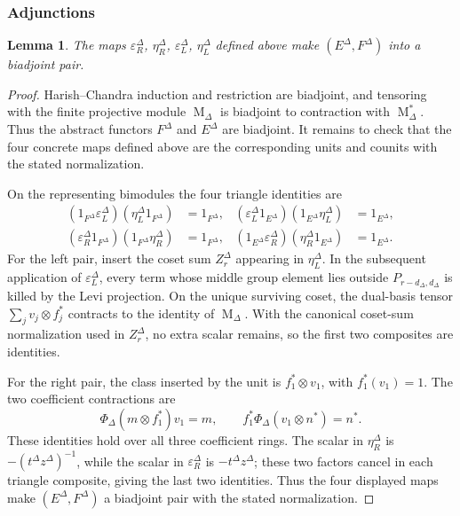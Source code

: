 \documentclass[12pt]{amsart}
\numberwithin{itemcounter}{subsection}
\theoremstyle{plain}
\newtheorem{lemma}[theorem]{Lemma}
\theoremstyle{definition}
\theoremstyle{remark}
\numberwithin{equation}{section}
\def\M{{\operatorname{M}\nolimits}}
\begin{document}
\subsubsection{Adjunctions}
\begin{lemma}
\label{lem:adjointpair}
The maps $\varepsilon^\Delta_R$, $\eta^\Delta_R$, $\varepsilon^\Delta_L$, $\eta^\Delta_L$ defined above make $(E^\Delta,F^\Delta)$ into a biadjoint pair.
\end{lemma}
\begin{proof}
Harish--Chandra induction and restriction are biadjoint, and tensoring with the
finite projective module \(\M_\Delta\) is biadjoint to contraction with
\(\M_\Delta^*\).  Thus the abstract functors \(F^\Delta\) and \(E^\Delta\)
are biadjoint.  It remains to check that the four concrete maps defined above
are the corresponding units and counits with the stated normalization.

On the representing bimodules the four triangle identities are
\begin{align*}
(1_{F^\Delta}\varepsilon_L^\Delta)
(\eta_L^\Delta1_{F^\Delta})&=1_{F^\Delta},&
(\varepsilon_L^\Delta1_{E^\Delta})
(1_{E^\Delta}\eta_L^\Delta)&=1_{E^\Delta},\\
(\varepsilon_R^\Delta1_{F^\Delta})
(1_{F^\Delta}\eta_R^\Delta)&=1_{F^\Delta},&
(1_{E^\Delta}\varepsilon_R^\Delta)
(\eta_R^\Delta1_{E^\Delta})&=1_{E^\Delta}.
\end{align*}
For the left pair, insert the coset sum \(Z_r^\Delta\) appearing in
\(\eta_L^\Delta\).  In the subsequent application of
\(\varepsilon_L^\Delta\), every term whose middle group element lies outside
\(P_{r-d_\Delta,d_\Delta}\) is killed by the Levi projection.  On the unique
surviving coset, the dual-basis tensor
\(\sum_jv_j\otimes f_j^*\) contracts to the identity of \(\M_\Delta\).
With the canonical coset-sum normalization used in \(Z_r^\Delta\), no extra
scalar remains, so the first two composites are identities.

For the right pair, the class inserted by the unit is
\(f_1^*\otimes v_1\), with \(f_1^*(v_1)=1\).  The two coefficient
contractions are
\[
 \Phi_\Delta(m\otimes f_1^*)v_1=m,
 \qquad
 f_1^*\Phi_\Delta(v_1\otimes n^*)=n^*.
\]
These identities hold over all three coefficient rings.  The scalar in \(\eta_R^\Delta\) is
\(-(t^\Delta z^\Delta)^{-1}\), while the scalar in \(\varepsilon_R^\Delta\)
is \(-t^\Delta z^\Delta\); these two factors cancel in each triangle
composite, giving the last two identities.
Thus the four displayed maps make \((E^\Delta,F^\Delta)\) a biadjoint pair
with the stated normalization.
\end{proof}
\smallskip
\end{document}
